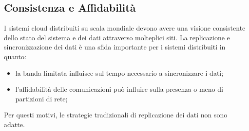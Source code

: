 \documentclass{article}
\begin{document}
\subsection{Consistenza e Affidabilità}
I sistemi cloud distribuiti su scala mondiale devono avere una visione consistente dello stato del sistema e dei dati attraverso molteplici siti. La replicazione e sincronizzazione dei dati è una sfida importante per i sistemi distribuiti in quanto:
\begin{itemize}
    \item la banda limitata influisce sul tempo necessario a sincronizzare i dati;
    \item l'affidabilità delle comunicazioni può influire sulla presenza o meno di partizioni di rete\footnotemark;
\end{itemize}
Per questi motivi, le strategie tradizionali di replicazione dei dati non sono adatte.
\end{document}
